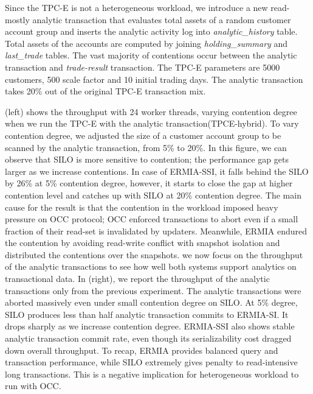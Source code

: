 Since the TPC-E is not a heterogeneous workload, we introduce a new read-mostly analytic transaction that evaluates total assets of a random customer account group and inserts the analytic activity log into \textit{analytic\_history} table. Total assets of the accounts are computed by joining \textit{holding\_summary} and \textit{last\_trade} tables. The vast majority of contentions occur between the analytic transaction and \textit{trade-result} transaction. The TPC-E parameters are 5000 customers, 500 scale factor and 10 initial trading days. The analytic transaction takes 20\% out of the original TPC-E transaction mix. %


(left) shows the throughput with 24 worker threads, varying contention degree when we run the TPC-E with the analytic transaction(TPCE-hybrid). To vary contention degree, we adjusted the size of a customer account group to be scanned by the analytic transaction, from 5\% to 20\%. In this figure, we can observe that SILO is more sensitive to contention; the performance gap gets larger as we increase contentions. In case of ERMIA-SSI, it falls behind the SILO by 26\% at 5\% contention degree, however, it starts to close the gap at higher contention level and catches up with SILO at 20\% contention degree. 
The main cause for the result is that the contention in the workload imposed heavy pressure on OCC protocol; OCC enforced transactions to abort even if a small fraction of their read-set is invalidated by updaters. Meanwhile, ERMIA endured the contention by avoiding read-write conflict with snapshot isolation and distributed the contentions over the snapshots. 
we now focus on the throughput of the analytic transactions to see how well both systems support analytics on transactional data. In (right), we report the throughput of the analytic transactions only from the previous experiment. The analytic transactions were aborted massively even under small contention degree on SILO. At 5\% degree, SILO produces less than half analytic transaction commits to ERMIA-SI. It drops sharply as we increase contention degree. ERMIA-SSI also shows stable analytic transaction commit rate, even though its serializability cost dragged down overall throughput. To recap, ERMIA provides balanced query and transaction performance, while SILO extremely gives penalty to read-intensive long transactions. This is a negative implication for heterogeneous workload to run with OCC. 

